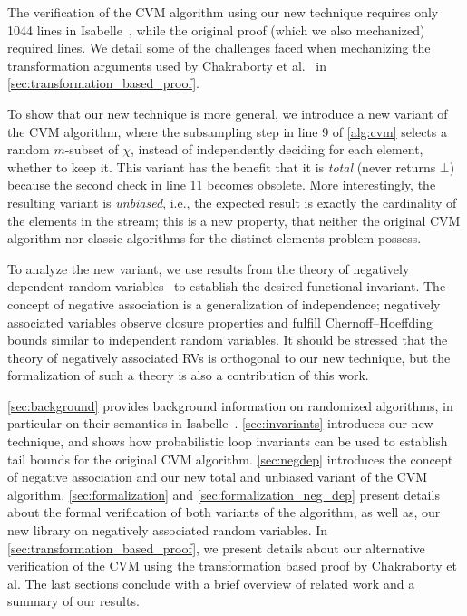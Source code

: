 The verification of the CVM algorithm using our new technique requires only 1044 lines in Isabelle~\cite{nipkow2002}, while the original proof (which we also mechanized) required  lines.
We detail some of the challenges faced when mechanizing the transformation arguments used by Chakraborty et al.~\cite{chakraborty2022,chakraborty2023} in \cref{sec:transformation_based_proof}.

To show that our new technique is more general, we introduce a new variant of the CVM algorithm, where the subsampling step in line 9 of \cref{alg:cvm} selects a random $m$-subset of $\chi$, instead of independently deciding for each element, whether to keep it.
This variant has the benefit that it is \emph{total} (never returns $\bot$) because the second check in line 11 becomes obsolete.
More interestingly, the resulting variant is \emph{unbiased}, i.e., the expected result is exactly the cardinality of the elements in the stream; this is a new property, that neither the original CVM algorithm nor classic algorithms for the distinct elements problem possess.

To analyze the new variant, we use results from the theory of negatively dependent random variables~\cite{joagdev1983} to establish the desired functional invariant.
The concept of negative association is a generalization of independence; negatively associated variables observe closure properties and fulfill Chernoff--Hoeffding bounds similar to independent random variables.
It should be stressed that the theory of negatively associated RVs is orthogonal to our new technique, but the formalization of such a theory is also a contribution of this work.

\cref{sec:background} provides background information on randomized algorithms, in particular on their semantics in Isabelle~\cite{nipkow2002}.
\cref{sec:invariants} introduces our new technique, and shows how probabilistic loop invariants can be used to establish tail bounds for the original CVM algorithm.
\cref{sec:negdep} introduces the concept of negative association and our new total and unbiased variant of the CVM algorithm.
\cref{sec:formalization} and \cref{sec:formalization_neg_dep} present details about the formal verification of both variants of the algorithm, as well as, our new library on negatively associated random variables.
In \cref{sec:transformation_based_proof}, we present details about our alternative verification of the CVM using the transformation based proof by Chakraborty et al.
The last sections conclude with a brief overview of related work and a summary of our results.

